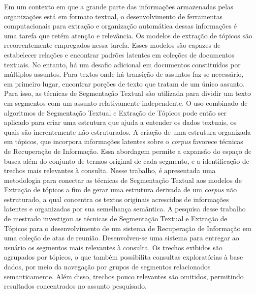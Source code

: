 \setlength{\absparsep}{18pt} %
                     
\begin{resumo}

Em um contexto em que a grande parte das informações armazenadas pelas organizações está em formato textual, o desenvolvimento de ferramentas computacionais para extração e organização automática dessas informações é uma tarefa que retém atenção e relevância.
%
Os modelos de extração de tópicos são recorrentemente empregados nessa tarefa. Esses modelos são capazes de estabelecer relações e encontrar padrões latentes em coleções de documentos textuais.
%
No entanto, há um desafio adicional em documentos constituídos por múltiplos assuntos. Para textos onde há transição de assuntos faz-se necessário, em primeiro lugar, encontrar porções de texto que tratam de um único assunto. Para isso, as técnicas de Segmentação Textual são utilizada para dividir um texto em segmentos com um assunto relativamente independente.
%
%
%
%
%
O uso combinado de algoritmos de Segmentação Textual e Extração de Tópicos pode então ser aplicado para criar uma estrutura que ajuda a entender os dados textuais, os quais são inerentemente não estruturados.
% 
A criação de uma estrutura organizada em tópicos, que incorpora informações latentes sobre o \textit{corpus} favorece técnicas de Recuperação de Informação. Essa abordagem permite a expansão do espaço de busca além do conjunto de termos original de cada segmento, e a identificação de trechos mais relevantes à consulta.
% 
Nesse trabalho, é apresentada uma metodologia para conectar as técnicas de Segmentação Textual aos modelos de Extração de tópicos a fim de gerar uma estrutura derivada de um \textit{corpus} não estruturado, a qual concentra os textos originais acrescidos de informações latentes e organizadas por sua semelhança semântica.
% 
% 
% 
% 
% 
% 
A pesquisa desse trabalho de mestrado investigou as técnicas de Segmentação Textual e Extração de Tópicos para o desenvolvimento de um sistema de Recuperação de Informação em uma coleção de atas de reunião. 
% 
Desenvolveu-se uma sistema para entregar ao usuário os segmentos mais relevantes à consulta. Os trechos exibidos são agrupados por tópicos, o que também possibilita consultas exploratórias à base dados, por meio da navegação por grupos de segmentos relacionados semanticamente. Além disso, trechos pouco relevantes são omitidos, permitindo resultados concentrados no assunto pesquisado.

\end{resumo}
